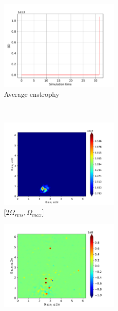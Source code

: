 \begin{figure}[H]
    \begin{subfigure}[H]{0.45\textwidth}
        \includegraphics[height=1.75in]{media/run-cds-65-5k/enst-average4750}
        \caption{Average enstrophy}
    \end{subfigure}
    ~
    \begin{subfigure}[H]{0.45\textwidth}
        \includegraphics[height=1.75in]{media/run-cds-65-5k/enst-2-4750}
        \caption{$[2\Omega_{rms}, \Omega_{max} $] }
    \end{subfigure}
    \newline
    \begin{subfigure}[H]{0.45\textwidth}
        \includegraphics[height=1.75in]{media/run-cds-65-5k/enst-4750}

\end{subfigure}
\end{figure}
